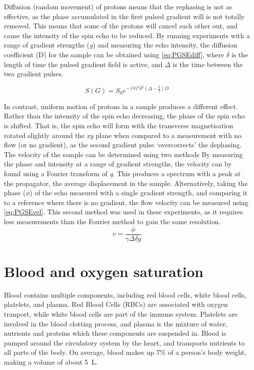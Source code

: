 Diffusion (random movement) of protons means that the rephasing is not as effective, as the phase accumulated in the first pulsed gradient will is not totally removed.
This means that some of the protons will cancel each other out, and cause the intensity of the spin echo to be reduced.
By running experiments with a range of gradient strengths (\textit{g}) and measuring the echo intensity, the diffusion coefficient (D) for the sample can be obtained using \autoref{eq:PGSEdiff}, where $\delta$ is the length of time the pulsed gradient field is active, and $\Delta$ is the time between the two gradient pulses.

\begin{equation}
S(G) = S_0 e^{-\gamma^2 G^2 \delta^2 (\Delta - \frac{\delta}{3} ) D}
\label{eq:PGSEdiff}
\end{equation}

In contrast, uniform motion of protons in a sample produces a different effect.
Rather than the intensity of the spin echo decreasing, the phase of the spin echo is shifted.
That is, the spin echo will form with the transverse magnetisation rotated slightly around the \textit{xy} plane when compared to a measurement with no flow (or no gradient), as the second gradient pulse `overcorrects' the dephasing.
The velocity of the sample can be determined using two methods \cite{CallaghanVelocitydiffusionimaging1991,XiaOneshotvelocitymicroscopy1992,CallaghanTranslationalDynamicsMagnetic2014}
By measuring the phase and intensity at a range of gradient strengths, the velocity can by found using a Fourier transform of \textit{q}.
This produces a spectrum with a peak at the propagator, the average displacement in the sample.
Alternatively, taking the phase ($\phi$) of the echo measured with a single gradient strength, and comparing it to a reference where there is no gradient, the flow velocity can be measured using \autoref{eq:PGSEvel}.
This second method was used in these experiments, as it requires less measurements than the Fourier method to gain the same resolution.
\begin{equation}
v = \frac{\phi}{\gamma \Delta \delta g}
\label{eq:PGSEvel}
\end{equation}

\section{Blood and oxygen saturation}

Blood contains multiple components, including red blood cells, white blood cells, platelets, and plasma.
Red Blood Cells (RBCs) are associated with oxygen tranport, while white blood cells are part of the immune system.
Platelets are involved in the blood clotting process, and plasma is the mixture of water, nutrients and proteins which these components are suspended in.
Blood is pumped around the circulatory system by the heart, and transports nutrients to all parts of the body.
On average, blood makes up 7\% of a person's body weight, making a volume of about \SI{5}{L}.

